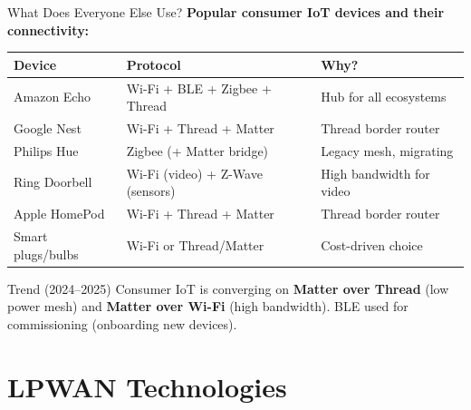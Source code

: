 \documentclass[aspectratio=169,11pt]{beamer}
\begin{document}
\begin{frame}{What Does Everyone Else Use?}
    \textbf{Popular consumer IoT devices and their connectivity:}
    
    \vspace{0.3cm}
    \begin{center}
    \begin{tabular}{lll}
        \toprule
        \textbf{Device} & \textbf{Protocol} & \textbf{Why?} \\
        \midrule
        Amazon Echo & Wi-Fi + BLE + Zigbee + Thread & Hub for all ecosystems \\
        Google Nest & Wi-Fi + Thread + Matter & Thread border router \\
        Philips Hue & Zigbee (+ Matter bridge) & Legacy mesh, migrating \\
        Ring Doorbell & Wi-Fi (video) + Z-Wave (sensors) & High bandwidth for video \\
        Apple HomePod & Wi-Fi + Thread + Matter & Thread border router \\
        Smart plugs/bulbs & Wi-Fi or Thread/Matter & Cost-driven choice \\
        \bottomrule
    \end{tabular}
    \end{center}
    
    \vspace{0.3cm}
    \begin{exampleblock}{Trend (2024--2025)}
        Consumer IoT is converging on \textbf{Matter over Thread} (low power mesh) and \textbf{Matter over Wi-Fi} (high bandwidth). BLE used for commissioning (onboarding new devices).
    \end{exampleblock}
\end{frame}

\section{LPWAN Technologies}
\end{document}
